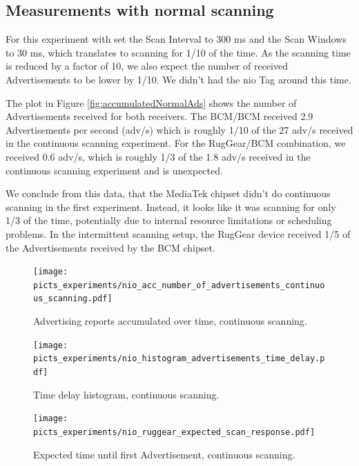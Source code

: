 \documentclass[a4paper,titlepage,oneside,12pt]{amsart} %
\begin{document}
\subsection{Measurements with normal scanning}
For this experiment with set the Scan Interval to 300 ms and the Scan Windows to 30 ms, which translates to scanning for 1/10 of the time. As the scanning time is reduced by a factor of 10, we also expect the number of received Advertisements to be lower by 1/10. We didn't had the nio Tag around this time.

The plot in Figure \ref{fig:accumulatedNormalAds} shows the number of Advertisements received for both receivers. The BCM/BCM received 2.9 Advertisements per second (adv/s) which is roughly 1/10 of the 27 adv/s received in the continuous scanning experiment. For the RugGear/BCM combination, we received 0.6 adv/s, which is roughly 1/3 of the 1.8 adv/s received in the continuous scanning experiment and is unexpected.

We conclude from this data, that the MediaTek chipset didn't do continuous scanning in the first experiment. Instead, it looks like it was scanning for only 1/3 of the time, potentially due to internal resource limitations or scheduling problems. In the intermittent scanning setup, the RugGear device received 1/5 of the Advertisements received by the BCM chipset.

	
		\begin{figure}[htbp]
		\begin{center}
		 \texttt{[image: picts\_experiments/nio\_acc\_number\_of\_advertisements\_continuous\_scanning.pdf]} 
		\caption{Advertising reports accumulated over time, continuous scanning.}
		\label{fig:accumulatedAds}
		\end{center}
		\end{figure}

		\begin{figure}[htbp]
		\begin{center}
		 \texttt{[image: picts\_experiments/nio\_histogram\_advertisements\_time\_delay.pdf]} 
		\caption{Time delay histogram,  continuous scanning.}
		\label{fig:delayHist}
		\end{center}
		\end{figure}

		\begin{figure}[htbp]
		\begin{center}
		 \texttt{[image: picts\_experiments/nio\_ruggear\_expected\_scan\_response.pdf]} 
		\caption{Expected time until first Advertisement, continuous scanning.}
		\label{fig:expectedDelay}
		\end{center}
		\end{figure}
		
\end{document}
